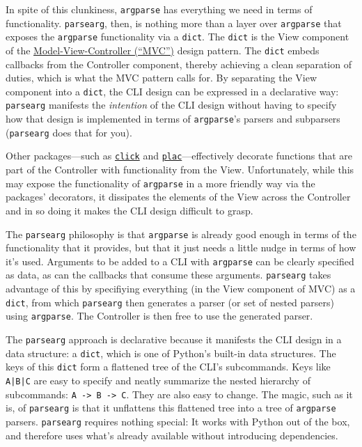 \documentclass[10pt]{amsart}
\numberwithin{equation}{section}
\begin{document}
In spite of this clunkiness, \texttt{argparse} has everything we need in 
terms of functionality. \texttt{parsearg}, then, is nothing more than a layer
over \texttt{argparse} that exposes the \texttt{argparse} functionality via a \texttt{dict}.
The \texttt{dict} is the View component of the 
\href{https://en.wikipedia.org/wiki/Model–view–controller}{Model-View-Controller (``MVC'')}
design pattern. The \texttt{dict} embeds callbacks from the Controller component,
thereby achieving a clean separation of duties, which is what the MVC pattern
calls for. By separating the View component into a \texttt{dict}, the CLI design
can be expressed in a declarative way: \texttt{parsearg} manifests the \emph{intention}
of the CLI design without having to specify how that design is implemented
in terms of \texttt{argparse}'s parsers and subparsers (\texttt{parsearg} does that
for you).

Other packages---such as \href{https://click.palletsprojects.com}{\texttt{click}} and \href{https://micheles.github.io/plac/}{\texttt{plac}}---effectively
decorate functions that are part of the Controller with functionality
from the View. Unfortunately, while this may 
expose the functionality of \texttt{argparse} in a more friendly way
via the packages' decorators, it dissipates the elements of the View 
across the Controller and in so doing it makes the CLI design difficult to grasp.

The \texttt{parsearg} philosophy is that \texttt{argparse} is already good enough in terms
of the functionality that it provides, but that it just needs a little nudge
in terms of how it's used.  Arguments to be added to a CLI with \texttt{argparse}
can be clearly specified as data, as can the callbacks that
consume these arguments. \texttt{parsearg} takes advantage of this by specifiying
everything (in the View component of MVC) as a \texttt{dict}, from which \texttt{parsearg}
then generates a parser (or set of nested parsers) using \texttt{argparse}. 
The Controller is then free to use the generated parser.

The \texttt{parsearg} approach is declarative because it manifests the CLI design
in a data structure: a \texttt{dict}, which is one of Python's built-in data structures.
The keys of this \texttt{dict} form a flattened tree of the CLI's subcommands. 
Keys like \texttt{A|B|C} are easy to specify and neatly summarize the nested
hierarchy of subcommands: \texttt{A -> B -> C}. They are also easy to change. 
The magic, such as it is, of \texttt{parsearg} is that it unflattens 
this flattened tree into a tree of \texttt{argparse} parsers. \texttt{parsearg} requires nothing 
special: It works with Python out of the box, and therefore uses
what's already available without introducing dependencies.
\end{document}
